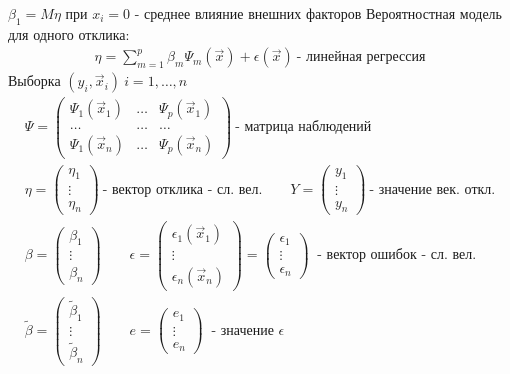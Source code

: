 \documentclass{article}
\begin{document}
$\beta_1=M\eta$ при $x_i=0$ - среднее влияние внешних факторов
Вероятностная модель для одного отклика:
\begin{gather*}
  \eta = \sum_{m=1}^{p}\beta_m\Psi_m(\vec{x}) + \epsilon(\vec{x}) \ \text{- линейная регрессия}
\end{gather*}
Выборка $(y_i,\vec{x}_i) \ i=1,\dots ,n$
\begin{gather*}
  \Psi = \begin{pmatrix}
    \Psi_1(\vec{x}_1) & \dots & \Psi_p(\vec{x}_1) \\ 
    \dots & \dots & \dots \\ 
    \Psi_1(\vec{x}_n) & \dots & \Psi_p(\vec{x}_n)
  \end{pmatrix} \ \text{- матрица наблюдений} \\ 
  \eta = \begin{pmatrix}
    \eta_1 \\ \vdots \\ \eta_n
  \end{pmatrix} \ \text{- вектор отклика - сл. вел.} \qquad
  Y = \begin{pmatrix}
    y_1 \\ \vdots \\ y_n
  \end{pmatrix} \ \text{- значение век. откл.} \\ 
  \beta = \begin{pmatrix}
    \beta_1 \\ \vdots \\ \beta_n
  \end{pmatrix} \qquad 
  \epsilon = \begin{pmatrix}
    \epsilon_1(\vec{x}_1) \\ \vdots \\ \epsilon_n(\vec{x}_n)
  \end{pmatrix} = \begin{pmatrix}
    \epsilon_1 \\ \vdots \\ \epsilon_n
  \end{pmatrix} \ \text{ - вектор ошибок - сл. вел.} \\ 
  \tilde\beta = \begin{pmatrix}
    \tilde\beta_1 \\ \vdots \\ \tilde\beta_n
  \end{pmatrix} \qquad 
  e = \begin{pmatrix}
    e_1 \\ \vdots \\ e_n
  \end{pmatrix}  \ \text{ - значение } \epsilon
\end{gather*}
\end{document}
